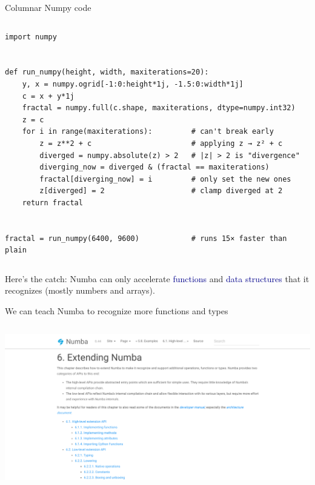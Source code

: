 \documentclass[aspectratio=169]{beamer}
\begin{document}
\begin{frame}[fragile]{Columnar Numpy code}
\begin{columns}
\small
\begin{verbatim}
import numpy


def run_numpy(height, width, maxiterations=20):
    y, x = numpy.ogrid[-1:0:height*1j, -1.5:0:width*1j]
    c = x + y*1j
    fractal = numpy.full(c.shape, maxiterations, dtype=numpy.int32)
    z = c
    for i in range(maxiterations):         # can't break early
        z = z**2 + c                       # applying z → z² + c
        diverged = numpy.absolute(z) > 2   # |z| > 2 is "divergence"
        diverging_now = diverged & (fractal == maxiterations)
        fractal[diverging_now] = i         # only set the new ones
        z[diverged] = 2                    # clamp diverged at 2
    return fractal


fractal = run_numpy(6400, 9600)            # runs 15× faster than plain
\end{verbatim}
\end{columns}
\end{frame}

\begin{frame}{Here's the catch:}
\Large
\vspace{0.5 cm}
Numba can only accelerate \textcolor{darkblue}{functions} and \textcolor{darkblue}{data structures} that it recognizes (mostly numbers and arrays).

\vspace{1 cm}

\vspace{1 cm}
\end{frame}

\begin{frame}{We can teach Numba to recognize more functions and types}
\vspace{0.5 cm}
\begin{columns}
\includegraphics[width=\linewidth]{numba-extending.png}
\end{columns}
\end{frame}
\end{document}
